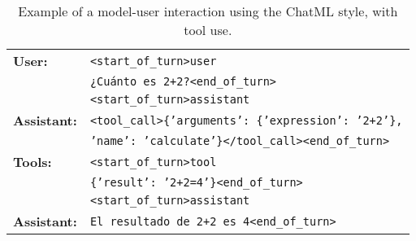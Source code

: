 \begin{table}[ht!]
    \setlength{\tabcolsep}{6pt}
    \centering
    \footnotesize   
    \begin{tabular}{ll}
    \toprule
    \vspace{0.2cm}
    \textbf{User:} & {\color{blue}\texttt{<start\_of\_turn>user}} \vspace{-0.2cm} \\
    & \texttt{¿Cuánto es 2+2?}{\color{blue}\texttt{<end\_of\_turn>}} \\
    & {\color{blue}\texttt{<start\_of\_turn>assistant}} \vspace{0.1cm} \\
    \textbf{Assistant:} & \texttt{<tool\_call>\{'arguments': \{'expression': '2+2'\},}\\ 
    & \texttt{'name': 'calculate'\}</tool\_call>}{\color{blue}\texttt{<end\_of\_turn>}} \vspace{0.1cm} \\
    \textbf{Tools:} & {\color{blue}\texttt{<start\_of\_turn>tool}} \\
    & \texttt{\{'result': '2+2=4'\}}{\color{blue}\texttt{<end\_of\_turn>}} \\
    & {\color{blue}\texttt{<start\_of\_turn>assistant}} \vspace{0.1cm} \\
    \textbf{Assistant:} & \texttt{El resultado de 2+2 es 4}{\color{blue}\texttt{<end\_of\_turn>}} \vspace{0.1cm} \\
    \bottomrule
    \end{tabular}
    \caption{Example of a model-user interaction using the ChatML style, with tool use.}
    \label{tab:chatml_tools}
    \vspace{-0.5cm}
\end{table}